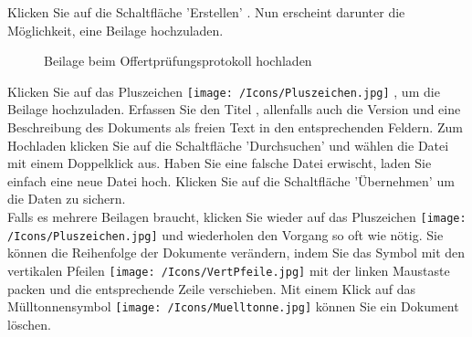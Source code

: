 \vspace{\baselineskip}

Klicken Sie auf die Schaltfläche 'Erstellen' . Nun erscheint darunter die Möglichkeit, eine Beilage hochzuladen.

\begin{figure}[H]
\caption{Beilage beim Offertprüfungsprotokoll hochladen}
\end{figure}

Klicken Sie auf das Pluszeichen \texttt{[image: /Icons/Pluszeichen.jpg]} , um die Beilage hochzuladen. Erfassen Sie den Titel , allenfalls auch die Version  und eine Beschreibung des Dokuments  als freien Text in den entsprechenden Feldern. Zum Hochladen klicken Sie auf die Schaltfläche 'Durchsuchen'  und wählen die Datei mit einem Doppelklick aus. Haben Sie eine falsche Datei erwischt, laden Sie einfach eine neue Datei hoch. Klicken Sie auf die Schaltfläche 'Übernehmen' um die Daten zu sichern. \\
Falls es mehrere Beilagen braucht, klicken Sie wieder auf das Pluszeichen \texttt{[image: /Icons/Pluszeichen.jpg]}  und wiederholen den Vorgang so oft wie nötig. Sie können die Reihenfolge der Dokumente verändern, indem Sie das Symbol mit den vertikalen Pfeilen \texttt{[image: /Icons/VertPfeile.jpg]}  mit der linken Maustaste packen und die entsprechende Zeile verschieben. Mit einem Klick auf das Mülltonnensymbol \texttt{[image: /Icons/Muelltonne.jpg]}  können Sie ein Dokument löschen.

\vspace{\baselineskip}

